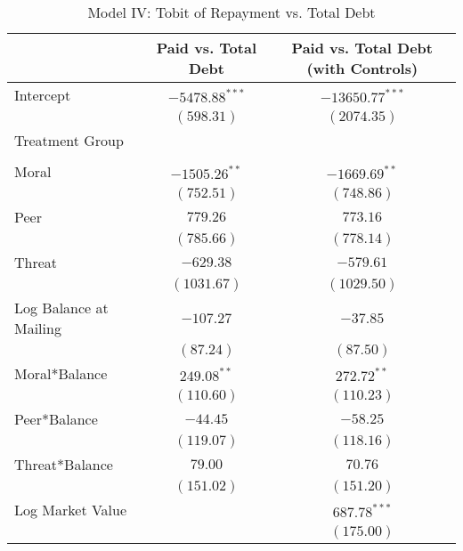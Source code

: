 \documentclass[12pt,titlepage]{article}
\begin{document}
\begin{table}
\begin{center}
\caption{Model IV: Tobit of Repayment vs. Total Debt}
\label{table:modelIV}
\begin{tabular}{l c c }
\hline
                       & Paid vs. Total Debt & Paid vs. Total Debt (with Controls) \\
\hline
Intercept              & $-5478.88^{***}$ & $-13650.77^{***}$ \\
                       & $(598.31)$       & $(2074.35)$       \\
Treatment Group        &                  &                   \\
                       &                  &                   \\
\quad Moral            & $-1505.26^{**}$   & $-1669.69^{**}$    \\
                       & $(752.51)$       & $(748.86)$        \\
\quad Peer             & $779.26$         & $773.16$          \\
                       & $(785.66)$       & $(778.14)$        \\
\quad Threat           & $-629.38$        & $-579.61$         \\
                       & $(1031.67)$      & $(1029.50)$       \\
Log Balance at Mailing & $-107.27$        & $-37.85$          \\
                       & $(87.24)$        & $(87.50)$         \\
Moral*Balance          & $249.08^{**}$     & $272.72^{**}$      \\
                       & $(110.60)$       & $(110.23)$        \\
Peer*Balance           & $-44.45$         & $-58.25$          \\
                       & $(119.07)$       & $(118.16)$        \\
Threat*Balance         & $79.00$          & $70.76$           \\
                       & $(151.02)$       & $(151.20)$        \\
Log Market Value       &                  & $687.78^{***}$    \\
                       &                  & $(175.00)$        \\
\hline

\end{tabular}
\end{center}
\end{table}
\end{document}

